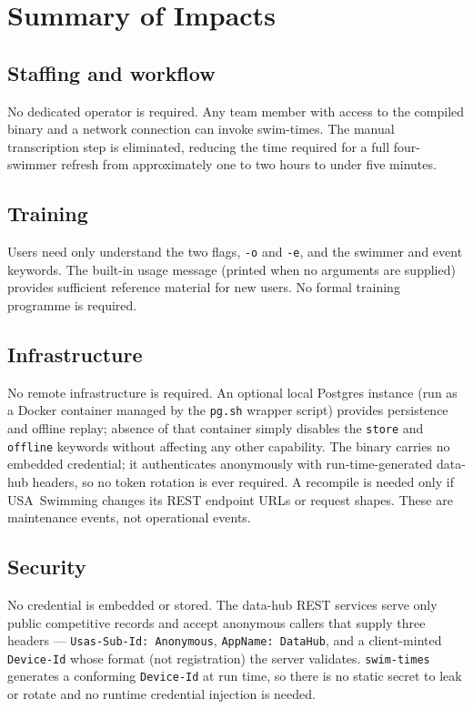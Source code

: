 \documentclass[12pt]{article}
\newcommand{\code}[1]{\texttt{#1}}
\begin{document}
\section{Summary of Impacts}

\subsection{Staffing and workflow}

No dedicated operator is required.  Any team member with access
to the compiled binary and a network connection can invoke
swim-times.  The manual transcription step is eliminated,
reducing the time required for a full four-swimmer refresh from
approximately one to two hours to under five minutes.

\subsection{Training}

Users need only understand the two flags, \code{-o} and \code{-e},
and the swimmer and event keywords.  The built-in usage message
(printed when no arguments are supplied) provides sufficient
reference material for new users.  No formal training programme
is required.

\subsection{Infrastructure}

No remote infrastructure is required.  An optional local Postgres
instance (run as a Docker container managed by the
\texttt{pg.sh} wrapper script) provides persistence and offline
replay; absence of that container simply disables the
\code{store} and \code{offline} keywords without affecting any
other capability.  The binary carries no embedded credential; it
authenticates anonymously with run-time-generated data-hub headers,
so no token rotation is ever required.  A recompile is needed only if
USA~Swimming changes its REST endpoint URLs or request shapes.  These
are maintenance events, not operational events.

\subsection{Security}

No credential is embedded or stored.  The data-hub REST services
serve only public competitive records and accept anonymous callers
that supply three headers --- \code{Usas-Sub-Id: Anonymous},
\code{AppName: DataHub}, and a client-minted \code{Device-Id} whose
format (not registration) the server validates.  \code{swim-times}
generates a conforming \code{Device-Id} at run time, so there is no
static secret to leak or rotate and no runtime credential injection is
needed.
\end{document}
